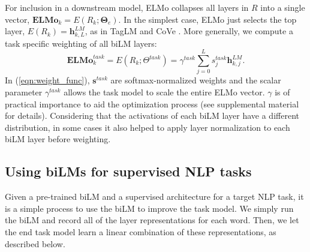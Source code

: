 \documentclass[11pt,a4paper]{article}
\newcommand{\ELMO}{ELMo}
\begin{document}
For inclusion in a downstream model, \ELMO{} collapses all layers in $R$ into a single vector, $\mathbf{ELMo}_k = E(R_k; \mathbf{\Theta}_e)$.
In the simplest case, \ELMO{} just selects the top layer, $E(R_k) = \mathbf{h}^{LM}_{k,L}$, as in TagLM \citep{Peters2017SemisupervisedST} and CoVe \citep{McCann2017LearnedIT}.
More generally, we compute a task specific weighting of all biLM layers:
\begin{equation}
\mathbf{ELMo}^{task}_k = E(R_k; \Theta^{task}) = \gamma^{task} \sum_{j=0}^L s^{task}_j \mathbf{h}^{LM}_{k,j}. \label{eqn:weight_func}
\end{equation}
In (\ref{eqn:weight_func}), $\mathbf{s}^{task}$ are softmax-normalized weights and the scalar parameter $\gamma^{task}$ allows the task model to scale the entire \ELMO{} vector.  $\gamma$ is of practical importance to aid the optimization process (see supplemental material for details).
Considering that the activations of each biLM layer have a different distribution, in some cases it also helped to apply layer normalization \citep{Ba2016LayerN} to each biLM layer before weighting.


\subsection{Using biLMs for supervised NLP tasks}
\label{sec:using_bilm}
Given a pre-trained biLM and a supervised architecture for a target NLP task, it is a simple process to use the biLM to improve the task model.
We simply run the biLM and record all of the layer representations for each word.  Then, we let the end task model learn a linear combination of these representations, as described below. 
\end{document}
